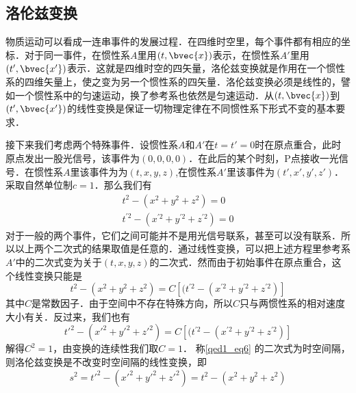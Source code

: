 

\subsection{洛伦兹变换}
\begin{definition}{}
物质运动可以看成一连串事件的发展过程．在四维时空里，每个事件都有相应的坐标．对于同一事件，在惯性系$A$里用$(t, \bvec{x})$表示，在惯性系$A'$里用$(t', \bvec{x'})$表示．这就是四维时空的四矢量，洛伦兹变换就是作用在一个惯性系的四维矢量上，使之变为另一个惯性系的四矢量．洛伦兹变换必须是线性的，譬如一个惯性系中的匀速运动，换了参考系也依然是匀速运动．从$(t, \bvec{x})$到$(t', \bvec{x'})$的线性变换是保证一切物理定律在不同惯性系下形式不变的基本要求．

接下来我们考虑两个特殊事件．设惯性系$A$和$A'$在$t=t'=0$时在原点重合，此时原点发出一股光信号，该事件为$(0,0,0,0)$．在此后的某个时刻，P点接收一光信号．在惯性系$A$里该事件为为$(t,x,y,z)$,在惯性系$A'$里该事件为$(t',x',y',z')$．采取自然单位制$c=1$．那么我们有
\begin{equation}\label{qed1_eq6}
\begin{array}{c}
t^{2}-(x^{2}+y^{2}+z^{2})=0 \\
t^{\prime 2}-(x^{\prime 2}+y^{\prime 2}+z^{\prime 2})=0
\end{array}
\end{equation}
对于一般的两个事件，它们之间可能并不是用光信号联系，甚至可以没有联系．所以以上两个二次式的结果取值是任意的．通过线性变换，可以把上述方程里参考系$A'$中的二次式变为关于$(t,x,y,z)$的二次式．然而由于初始事件在原点重合，这个线性变换只能是
\begin{equation}
t^{2}-(x^{2}+y^{2}+z^{2})=C\left[(t^{\prime 2}-(x^{\prime 2}+y^{\prime 2}+z^{\prime 2})\right]
\end{equation}
其中$C$是常数因子．由于空间中不存在特殊方向，所以$C$只与两惯性系的相对速度大小有关．反过来，我们也有
\begin{equation}
t'^{2}-(x'^{2}+y'^{2}+z'^{2})=C\left[(t^{\prime 2}-(x^{\prime 2}+y^{\prime 2}+z^{\prime 2})\right]
\end{equation}
解得$C^2=1$，由变换的连续性我们取$C=1$．
称\autoref{qed1_eq6} 的二次式为时空间隔，则洛伦兹变换是不改变时空间隔的线性变换，即
\begin{equation}
s^2=t'^{2}-(x'^{2}+y'^{2}+z'^{2})=t^{2}-(x^{2}+y^{2}+z^{2})
\end{equation}
\end{definition}

